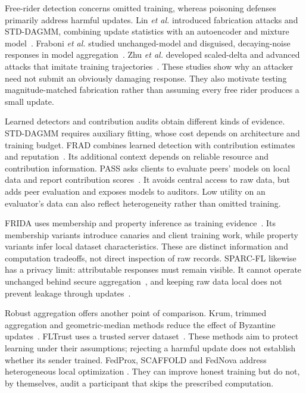 \documentclass[journal]{IEEEtran}
\makeatletter
\renewcommand{\section}{\@startsection{section}{1}{\z@}{1.5ex}{0.7ex}{\normalfont\normalsize\centering\scshape}}
\makeatother
\begin{document}
\section{Literature Review}\label{sec:related}
Free-rider detection concerns omitted training, whereas poisoning
defenses primarily address harmful updates. Lin \emph{et al.} introduced
fabrication attacks and STD-DAGMM, combining update statistics with an
autoencoder and mixture model~\cite{lin2019freeriders,zong2018dagmm}.
Fraboni \emph{et al.} studied unchanged-model and disguised, decaying-noise
responses in model aggregation~\cite{fraboni2021freerider}. Zhu \emph{et al.}
developed scaled-delta and advanced attacks that imitate training
trajectories~\cite{zhu2021advanced}. These studies show why an attacker
need not submit an obviously damaging response. They also motivate
testing magnitude-matched fabrication rather than assuming every free
rider produces a small update.

Learned detectors and contribution audits obtain different kinds of
evidence. STD-DAGMM requires auxiliary fitting, whose cost depends on
architecture and training budget. FRAD combines learned detection with
contribution estimates and reputation~\cite{wang2024frad}. Its additional
context depends on reliable resource and contribution information.
PASS asks clients to evaluate peers' models on local data and report
contribution scores~\cite{wang2024pass}. It avoids central access to raw
data, but adds peer evaluation and exposes models to auditors. Low
utility on an evaluator's data can also reflect heterogeneity rather
than omitted training.

FRIDA uses membership and property inference as training
evidence~\cite{recasens2026frida}. Its membership variants introduce
canaries and client training work, while property variants infer local
dataset characteristics. These are distinct information and computation
tradeoffs, not direct inspection of raw records. SPARC-FL likewise has a
privacy limit: attributable responses must remain visible. It cannot
operate unchanged behind secure aggregation~\cite{bonawitz2017practical},
and keeping raw data local does not prevent leakage through
updates~\cite{zhu2019leakage,melis2019leakage}.

Robust aggregation offers another point of comparison. Krum, trimmed
aggregation and geometric-median methods reduce the effect of Byzantine
updates~\cite{blanchard2017krum,yin2018byzantine,pillutla2022rfa}.
FLTrust uses a trusted server dataset~\cite{cao2021fltrust}. These methods
aim to protect learning under their assumptions; rejecting a harmful
update does not establish whether its sender trained. FedProx, SCAFFOLD
and FedNova address heterogeneous local optimization
\cite{li2020fedprox,karimireddy2020scaffold,wang2020fednova}. They can
improve honest training but do not, by themselves, audit a participant
that skips the prescribed computation.
\end{document}
